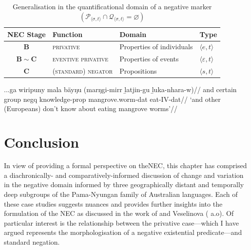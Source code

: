 \begin{table}[h]\centering
	\caption{Generalisation in the quantificational domain of a negative marker\\$(\mathcal P_{\langle\sigma,t\rangle}\cap\mathcal Q_{\langle\sigma,t\rangle}=\varnothing )$}\label{domainGen}\centering
\begin{tabular}{clll}
\textbf{NEC Stage} &	\textbf{Function} & \textbf{Domain} & \textbf{Type}\\\midrule
$ \boldsymbol{B} $ &	\textsc{privative}	& Properties of individuals&$ \langle e,t\rangle $\\
 $ \boldsymbol{B\!\sim\!C} $&	\textsc{eventive privative}& Properties of events&$ \langle\varepsilon,t\rangle $ \\
 $ \boldsymbol{C} $ &	\textsc{(standard) negator}& Propositions & $ \langle s,t\rangle $\\\bottomrule
\end{tabular}
\end{table}

 \pex\a \begingl\gla...ga wiripuny mala bäyŋu (marŋgi-mirr ḻatjin-gu ḻuka-nhara-w)//
\glb and certain group \gls{negq} knowledge-\gls{prop} mangrove.worm-\gls{dat} eat-IV-\gls{dat}//
\glft`and other (Europeans) don't know about eating mangrove worms'//\endgl
\a \fi


\section{Conclusion}

In view of providing a formal perspective on the\acrlong{NEC}, this chapter has comprised a diachronically- and comparatively-informed discussion of change and variation in the negative domain informed by three geographically distant and temporally deep subgroups of the Pama-Nyungan family of Australian languages. Each of these case studies suggests nuances and provides further insights into the formulation of the \acrshort{NEC} as discussed in the work of \citet{Croft1991} and Veselinova (\citeyear{Veselinova2016} a.o). Of particular interest is the relationship between the privative case---which I have argued represents the morphologisation of a negative existential predicate---and standard negation.


